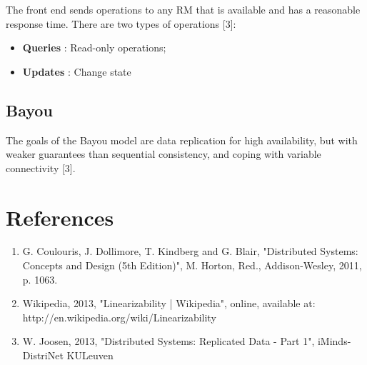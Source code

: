 The front end sends operations to any RM that is available and has a reasonable response time. There are two types of operations [3]:
\begin{itemize}
	\item \textbf{Queries} : Read-only operations;
	\item \textbf{Updates} : Change state
\end{itemize}


\subsection{Bayou}

The goals of the Bayou model are data replication for high availability, but with weaker guarantees than sequential consistency, and coping with variable connectivity [3].




\section*{References}

\begin{enumerate}[1]
	\item G. Coulouris, J. Dollimore, T. Kindberg and G. Blair, "Distributed Systems: Concepts and Design (5th Edition)", M. Horton, Red., Addison-Wesley, 2011, p. 1063.
	\item Wikipedia, 2013, "Linearizability | Wikipedia", online, available at:  http://en.wikipedia.org/wiki/Linearizability
	\item W. Joosen, 2013, "Distributed Systems: Replicated Data - Part 1",  iMinds-DistriNet KULeuven
\end{enumerate}


